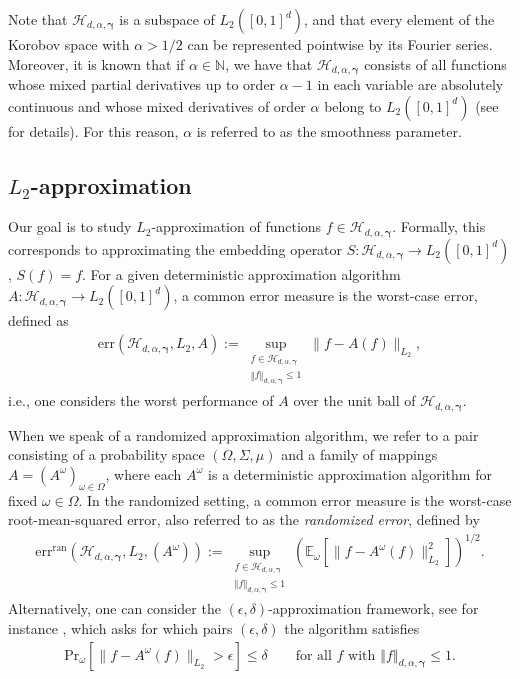 \documentclass[pdflatex,sn-basic,Numbered]{sn-jnl}%
\newcommand{\bsgamma}{\boldsymbol{\gamma}}
\newcommand{\EE}{\mathbb{E}}
\newcommand{\NN}{\mathbb{N}}
\newcommand{\Hcal}{\mathcal{H}}
\newcommand{\norm}[1]{\left\Vert#1\right\Vert}
\theoremstyle{thmstyleone}%
\theoremstyle{thmstyletwo}%
\begin{document}
Note that $\Hcal_{d,\alpha,\bsgamma}$ is a subspace of $L_2 ([0,1]^d)$, and that every element of the Korobov space with $\alpha>1/2$ can be represented pointwise by its Fourier series. Moreover, it is known that if $\alpha\in\NN$, we have that $\Hcal_{d,\alpha,\bsgamma}$ consists of all functions whose mixed partial derivatives up to order $\alpha-1$ in each variable are absolutely continuous and whose mixed derivatives of order $\alpha$ belong to $L_2 ([0,1]^d)$ (see \cite{dick2022component,kritzer2019lattice} for details). For this reason, $\alpha$ is referred to as the smoothness parameter. 

\subsection{$L_2$-approximation}\label{subsec:approximation}
Our goal is to study $L_2$-approximation of functions $f\in \Hcal_{d,\alpha,\bsgamma}$. Formally, this corresponds to approximating the embedding operator $S:\Hcal_{d,\alpha,\bsgamma}\to L_2 ([0,1]^d)$, $S(f)=f$. For a given deterministic approximation algorithm $A:\Hcal_{d,\alpha,\bsgamma}\to L_2 ([0,1]^d)$, a common error measure is the worst-case error, defined as
\begin{align}\label{eq:worst-case}
  \mathrm{err}(\Hcal_{d,\alpha,\bsgamma}, L_2, A):= \sup_{\substack{f\in \Hcal_{d,\alpha,\bsgamma}\\ 
  \norm{f}_{d,\alpha,\bsgamma}\le 1}}
  \|f-A(f)\|_{L_2},
\end{align}
i.e., one considers the worst performance of $A$ over the unit ball of $\Hcal_{d,\alpha,\bsgamma}$. 

When we speak of a randomized approximation algorithm, we refer to a pair consisting of a probability space $(\Omega, \Sigma, \mu)$ and a family of mappings $A = (A^\omega)_{\omega \in \Omega}$, where each $A^\omega$ is a deterministic approximation algorithm for fixed $\omega \in \Omega$. 
In the randomized setting, a common error measure is the worst-case root-mean-squared error, also referred to as the \emph{randomized error}, defined by
\begin{align}\label{eq:worst-case_randomized}
  \mathrm{err}^{\mathrm{ran}}(\Hcal_{d,\alpha,\bsgamma}, L_2, (A^{\omega})):= \sup_{\substack{f\in \Hcal_{d,\alpha,\bsgamma}\\ 
  \norm{f}_{d,\alpha,\bsgamma}\le 1}}
  \left(\EE_{\omega}\left[\|f-A^{\omega}(f)\|^2_{L_2}\right]\right)^{1/2}.
\end{align}
Alternatively, one can consider the $(\epsilon,\delta)$-approximation framework, see for instance \cite{kunsch2019optimal}, which asks for which pairs $(\epsilon,\delta)$ the algorithm satisfies
\begin{align}\label{eq:eps-delta_framework} 
\mathrm{Pr}_{\omega}\left[\|f-A^{\omega}(f)\|_{L_2}>\epsilon \right]\le \delta \qquad \text{for all $f$ with $\norm{f}_{d,\alpha,\bsgamma}\le 1$.} \end{align}
\end{document}
